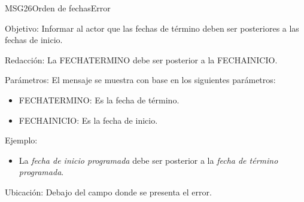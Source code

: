 \begin{mensaje}{MSG26}{Orden de fechas}{Error}
	\item [Objetivo:] Informar al actor que las fechas de término deben ser posteriores a las fechas de inicio.
	\item[Redacción:] La FECHATERMINO debe ser posterior a la FECHAINICIO.
	\item[Parámetros:] El mensaje se muestra con base en los siguientes parámetros:
	\begin{itemize}
		\item FECHATERMINO: Es la fecha de término.
		\item FECHAINICIO: Es la fecha de inicio.
	\end{itemize}
\item[Ejemplo:] \begin{itemize}
	\item La { \em fecha de inicio programada} debe ser posterior a la {\em fecha de término programada}.
\end{itemize}
	\item [Ubicación:] Debajo del campo donde se presenta el error.
\end{mensaje}